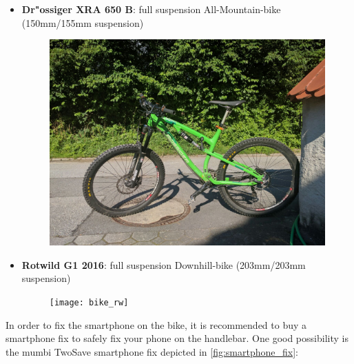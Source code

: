\documentclass[10pt,a4paper]{article} %
\begin{document}
	\begin{itemize}
		\item \textbf{Dr"ossiger XRA 650 B}: full suspension All-Mountain-bike (150mm/155mm suspension)

		\begin{figure}[H]
		\begin{center}
 		  \includegraphics[scale=0.05]{bike_dr}
		  \label{fig:bike_dr}
		\end{center}
		\end{figure}

		\item \textbf{Rotwild G1 2016}: full suspension Downhill-bike (203mm/203mm suspension)

		\begin{figure}[H]
		\begin{center}
 		  \texttt{[image: bike\_rw]}
		  \label{fig:bike_rw}
		\end{center}
		\end{figure}

	\end{itemize}
	In order to fix the smartphone on the bike, it is recommended to buy a smartphone fix to safely fix your phone on the handlebar. One good possibility is the mumbi TwoSave smartphone fix depicted in \autoref{fig:smartphone_fix}:
	
\end{document}
